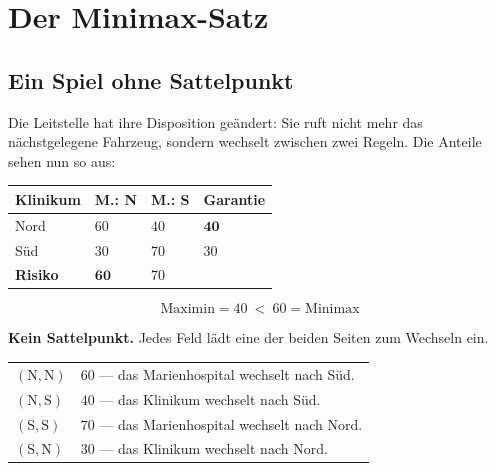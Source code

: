 \chapter{Der Minimax-Satz}

\section{Ein Spiel ohne Sattelpunkt}

\begin{merksatz}
Die Leitstelle hat ihre Disposition geändert: Sie ruft nicht mehr das nächstgelegene Fahrzeug, sondern wechselt zwischen zwei Regeln. Die Anteile sehen nun so aus:

\begin{center}
{\small
\renewcommand{\arraystretch}{1.55}
\begin{tabular}{@{}P{2.2cm}P{1.6cm}P{1.6cm}P{1.8cm}@{}}
\toprule
\textbf{Klinikum} & \textbf{M.: N} & \textbf{M.: S} & \textbf{Garantie}\\
\midrule
Nord & $60$ & $40$ & $\mathbf{40}$\\
Süd & $30$ & $70$ & $30$\\
\midrule
\textbf{Risiko} & $\mathbf{60}$ & $70$ & \\
\bottomrule
\end{tabular}}
\end{center}

\[ \text{Maximin} = 40 \ <\ 60 = \text{Minimax} \]

\begin{center}
\begin{minipage}{0.9\textwidth}
\textbf{Kein Sattelpunkt.} Jedes Feld lädt eine der beiden Seiten zum Wechseln ein.
\end{minipage}
\end{center}

\begin{center}
{\small
\renewcommand{\arraystretch}{1.5}
\begin{tabular}{@{}P{2.2cm}P{6.4cm}@{}}
\toprule
$(\text{N},\text{N})$ & $60$ --- das Marienhospital wechselt nach Süd.\\
$(\text{N},\text{S})$ & $40$ --- das Klinikum wechselt nach Süd.\\
$(\text{S},\text{S})$ & $70$ --- das Marienhospital wechselt nach Nord.\\
$(\text{S},\text{N})$ & $30$ --- das Klinikum wechselt nach Nord.\\
\bottomrule
\end{tabular}}
\end{center}


\end{merksatz}
